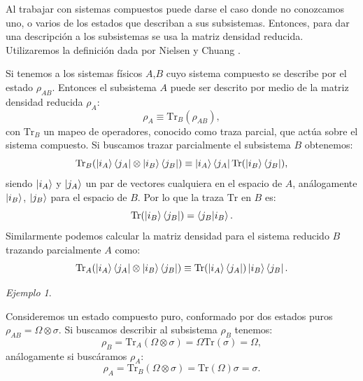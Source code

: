 \documentclass[letterpaper,12pt]{thesisECFM}
\theoremstyle{plain}
\theoremstyle{definition}
\theoremstyle{definition}
\theoremstyle{remark}
\newcommand{\1}{\mathbb{1}}
\newtheorem{ex}{Ejemplo}[section]
\begin{document}
Al trabajar con sistemas compuestos puede darse el caso donde no conozcamos
uno, o varios de los estados que describan a sus subsistemas. Entonces, para
dar una descripción a los subsistemas se usa la matriz densidad reducida.
Utilizaremos la definición dada por Nielsen y Chuang
\cite{nielsen_chuang_2011}.

Si tenemos a los sistemas físicos $A$,$B$ cuyo sistema compuesto se describe
por el estado $\rho_{AB}$. Entonces el subsistema $A$ puede ser descrito por
medio de la matriz densidad reducida $\rho_A$:
\begin{equation}
    \rho_A \equiv \text{Tr}_B(\rho_{AB}),
\end{equation}
con $\text{Tr}_B$ un mapeo de operadores, conocido como traza parcial, que
actúa sobre el sistema compuesto. Si buscamos trazar parcialmente el subsistema
$B$ obtenemos:
\begin{equation}
    \text{Tr}_B(\ket{i_A}\bra{j_A} \otimes \ket{i_B}\bra{j_B}  ) \equiv \ket{i_A} \bra{j_A} \text{Tr}(\ket{i_B}\bra{j_B}),
\end{equation}
siendo $\ket{i_A}$ y $\ket{j_A}$ un par de vectores cualquiera en el espacio de
$A$, análogamente $\ket{i_B}$, $\ket{j_B}$ para el espacio de $B$. Por lo que
la traza $\text{Tr}$ en $B$ es:
\begin{equation*}
    \text{Tr}(\ket{i_B}\bra{j_B}) = \bra{j_B}\ket{i_B}.
\end{equation*}
Similarmente podemos calcular la matriz densidad para el sistema reducido $B$
trazando parcialmente $A$ como:
\begin{equation}
    \text{Tr}_A(\ket{i_A}\bra{j_A} \otimes \ket{i_B}\bra{j_B}  ) \equiv  \text{Tr}(\ket{i_A} \bra{j_A}) \ket{i_B}\bra{j_B}.
\end{equation}
 

\begin{ex}\label{ex:traza parcial} \end{ex}  Consideremos un estado compuesto puro, conformado por dos estados puros $\rho_{AB} = \Omega  \otimes \sigma$. Si buscamos describir al subsistema $\rho_{B}$ tenemos:
\begin{equation}
    \rho_{B} = \text{Tr}_{A} (\Omega  \otimes \sigma) = \Omega \text{Tr}(\sigma) = \Omega, 
\end{equation}
análogamente si buscáramos $\rho_A$:
\begin{equation}
     \rho_{A} = \text{Tr}_{B} (\Omega  \otimes \sigma) = \text{Tr}(\Omega) \sigma = \sigma.
\end{equation}
\end{document}
